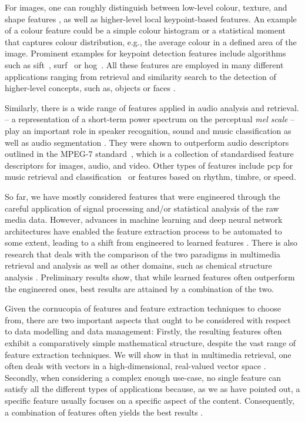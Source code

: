 For images, one can roughly distinguish between low-level colour, texture, and shape features \cite{Salau:2019Feature}, as well as higher-level local keypoint-based features. An example of a colour feature could be a simple colour histogram or a statistical moment that captures colour distribution, e.g., the average colour in a defined area of the image. Prominent examples for keypoint detection features include algorithms such as \acrfull{sift}~\cite{Lowe:1999object}, \acrfull{surf}~\cite{Bay:2006surf} or \acrfull{hog}~\cite{Dalal:2005Histograms}. All these features are employed in many different applications ranging from retrieval and similarity search to the detection of higher-level concepts, such as, objects or faces \cite{Deniz:2011Face, Farooq:2016Object}.

Similarly, there is a wide range of features applied in audio analysis and retrieval.  -- a representation of a short-term power spectrum on the perceptual \emph{mel scale} -- play an important role in speaker recognition, sound and music classification as well as audio segmentation \cite{Kim:2010Comparison}. They were shown to outperform audio descriptors outlined in the MPEG-7 standard~\cite{Quackenbush:2001Overview}, which is a collection of standardised feature descriptors for images, audio, and video. Other types of features include \acrfull{pcp} for music retrieval and classification~\cite{Lee:2006Automatic,Demirel:2019Automatic} or features based on rhythm, timbre, or speed. 

So far, we have mostly considered features that were engineered through the careful application of signal processing and/or statistical analysis of the raw media data. However, advances in machine learning and deep neural network architectures have enabled the feature extraction process to be automated to some extent, leading to a shift from  engineered to learned features \cite{Hamel:2010Learning,Gordo:2016Deep}. There is also research that deals with the comparison of the two paradigms in multimedia retrieval and analysis \cite{Budnik:2017learned} as well as other domains, such as chemical structure analysis \cite{Gallegos:2021importance}. Preliminary results show, that while learned features often outperform the engineered ones, best results are attained by a combination of the two.

Given the cornucopia of features and feature extraction techniques to choose from, there are two important aspects that ought to be considered with respect to data modelling and data management: Firstly, the resulting features often exhibit a comparatively simple mathematical structure, despite the vast range of feature extraction techniques. We will show in  that in multimedia retrieval, one often deals with vectors in a high-dimensional, real-valued vector space \cite{Zezula:2006Similarity}. Secondly, when considering a complex enough use-case, no single feature can satisfy all the different types of applications because, as we as have pointed out, a specific feature usually focuses on a specific aspect of the content. Consequently, a combination of features often yields the best results \cite{Deselaers:2008Features}.

